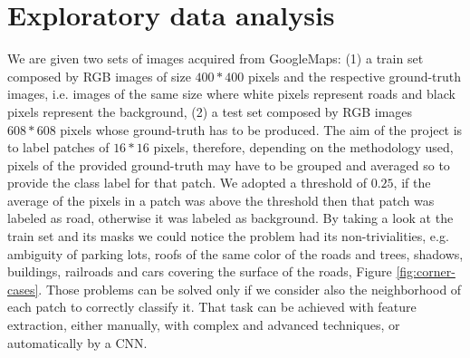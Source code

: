 \documentclass[10pt,conference,compsocconf]{IEEEtran}
\begin{document}


\section{Exploratory data analysis}
\label{sec:data-analysis}
We are given two sets of images acquired from GoogleMaps: (1) a train set composed by RGB images of size $400*400$ pixels and the respective ground-truth images, i.e. images of the same size where white pixels represent roads and black pixels represent the background, (2) a test set composed by RGB images $608*608$ pixels whose ground-truth has to be produced.
The aim of the project is to label patches of $16*16$ pixels, therefore, depending on the methodology used, pixels of the provided ground-truth may have to be grouped and averaged so to provide the class label for that patch. We adopted a threshold of $0.25$, if the average of the pixels in a patch was above the threshold then that patch was labeled as road, otherwise it was labeled as background.
By taking a look at the train set and its masks we could notice the problem had its non-trivialities, e.g. ambiguity of parking lots, roofs of the same color of the roads and trees, shadows, buildings, railroads and cars covering the surface of the roads, Figure \ref{fig:corner-cases}. Those problems can be solved only if we consider also the neighborhood of each patch to correctly classify it. That task can be achieved with feature extraction, either manually, with complex and advanced techniques, or automatically by a CNN.
\end{document}
